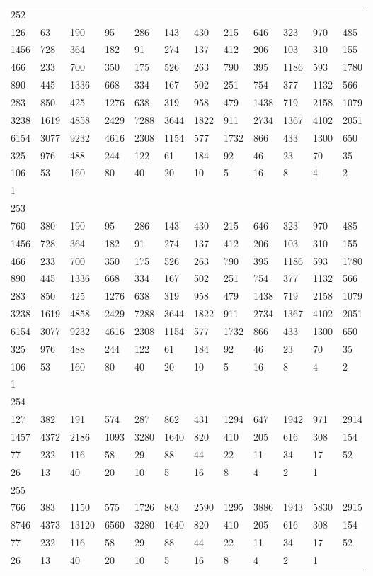 \begin{longtable}{llllllllllll}
252&&&&&&&&&&&\\
126& 63& 190& 95& 286& 143& 430& 215& 646& 323& 970& 485\\
1456& 728& 364& 182& 91& 274& 137& 412& 206& 103& 310& 155\\
466& 233& 700& 350& 175& 526& 263& 790& 395& 1186& 593& 1780\\
890& 445& 1336& 668& 334& 167& 502& 251& 754& 377& 1132& 566\\
283& 850& 425& 1276& 638& 319& 958& 479& 1438& 719& 2158& 1079\\
3238& 1619& 4858& 2429& 7288& 3644& 1822& 911& 2734& 1367& 4102& 2051\\
6154& 3077& 9232& 4616& 2308& 1154& 577& 1732& 866& 433& 1300& 650\\
325& 976& 488& 244& 122& 61& 184& 92& 46& 23& 70& 35\\
106& 53& 160& 80& 40& 20& 10& 5& 16& 8& 4& 2\\
1& \\

253&&&&&&&&&&&\\
760& 380& 190& 95& 286& 143& 430& 215& 646& 323& 970& 485\\
1456& 728& 364& 182& 91& 274& 137& 412& 206& 103& 310& 155\\
466& 233& 700& 350& 175& 526& 263& 790& 395& 1186& 593& 1780\\
890& 445& 1336& 668& 334& 167& 502& 251& 754& 377& 1132& 566\\
283& 850& 425& 1276& 638& 319& 958& 479& 1438& 719& 2158& 1079\\
3238& 1619& 4858& 2429& 7288& 3644& 1822& 911& 2734& 1367& 4102& 2051\\
6154& 3077& 9232& 4616& 2308& 1154& 577& 1732& 866& 433& 1300& 650\\
325& 976& 488& 244& 122& 61& 184& 92& 46& 23& 70& 35\\
106& 53& 160& 80& 40& 20& 10& 5& 16& 8& 4& 2\\
1& \\

254&&&&&&&&&&&\\
127& 382& 191& 574& 287& 862& 431& 1294& 647& 1942& 971& 2914\\
1457& 4372& 2186& 1093& 3280& 1640& 820& 410& 205& 616& 308& 154\\
77& 232& 116& 58& 29& 88& 44& 22& 11& 34& 17& 52\\
26& 13& 40& 20& 10& 5& 16& 8& 4& 2& 1& \\

255&&&&&&&&&&&\\
766& 383& 1150& 575& 1726& 863& 2590& 1295& 3886& 1943& 5830& 2915\\
8746& 4373& 13120& 6560& 3280& 1640& 820& 410& 205& 616& 308& 154\\
77& 232& 116& 58& 29& 88& 44& 22& 11& 34& 17& 52\\
26& 13& 40& 20& 10& 5& 16& 8& 4& 2& 1& \\


\end{longtable}
